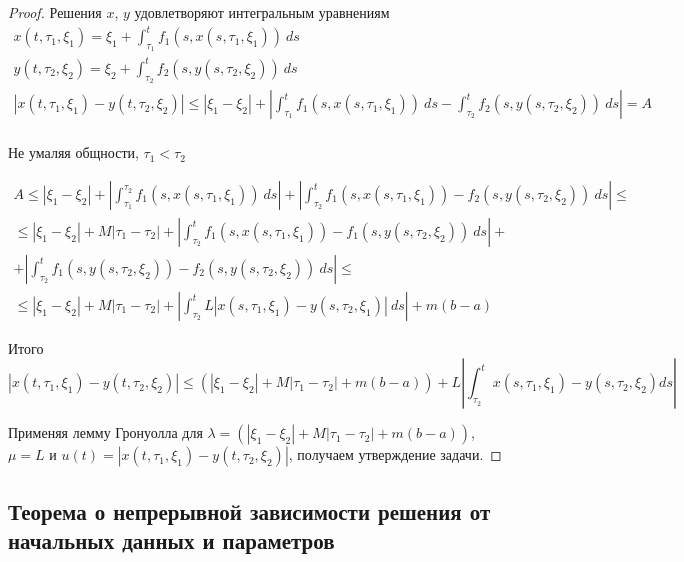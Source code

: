 \begin{proof}

  Решения $x$, $y$ удовлетворяют интегральным уравнениям
  $$
  \begin{gathered}
  x(t, \tau_1, \xi_1) = \xi_1 + \int_{\tau_1}^t f_1(s, x(s, \tau_1, \xi_1))\ ds \\
  y(t, \tau_2, \xi_2) = \xi_2 + \int_{\tau_2}^t f_2(s, y(s, \tau_2, \xi_2))\ ds \\
  \left|x(t, \tau_1, \xi_1) - y(t, \tau_2, \xi_2)\right| \leq |\xi_1 - \xi_2| + \left|\int_{\tau_1}^t f_1(s, x(s, \tau_1, \xi_1))\ ds - \int_{\tau_2}^t f_2(s, y(s, \tau_2, \xi_2))\ ds \right| = A \\
  \end{gathered}
  $$

  Не умаляя общности, $\tau_1 < \tau_2$
  
  $$
  \begin{gathered}
  A \leq |\xi_1 - \xi_2| + \left|\int_{\tau_1}^{\tau_2} f_1(s, x(s, \tau_1, \xi_1))\ ds\right| +  \left|\int_{\tau_2}^t f_1(s, x(s, \tau_1, \xi_1)) - f_2(s, y(s, \tau_2, \xi_2))\ ds \right| \leq \\
  \leq |\xi_1 - \xi_2| + M|\tau_1 - \tau_2| + \left| \int_{\tau_2}^t f_1(s, x(s, \tau_1, \xi_1)) - f_1(s, y(s, \tau_2, \xi_2))\ ds \right| + \\
  + \left| \int_{\tau_2}^t f_1(s, y(s, \tau_2, \xi_2)) - f_2(s, y(s, \tau_2, \xi_2))\ ds \right| \leq \\
  \leq |\xi_1 - \xi_2| + M|\tau_1 - \tau_2| + \left| \int_{\tau_2}^t L|x(s, \tau_1, \xi_1) - y(s, \tau_2, \xi_1)|\ ds\right| + m(b-a)
  \end{gathered}
  $$

  Итого
  $$\left|x(t, \tau_1, \xi_1) - y(t, \tau_2, \xi_2)\right| \leq \left(|\xi_1 - \xi_2| + M|\tau_1 - \tau_2| + m(b-a)\right) + L \left|\int_{\tau_2}^t x(s, \tau_1, \xi_1) - y(s, \tau_2, \xi_2) ds\right|$$

  Применяя лемму Гронуолла для $\lambda = \left(|\xi_1 - \xi_2| + M|\tau_1 - \tau_2| + m(b-a)\right)$, $\mu = L$ и $u(t) = \left|x(t, \tau_1, \xi_1) - y(t, \tau_2, \xi_2)\right|$, получаем утверждение задачи.

\end{proof}



\subsection{Теорема о непрерывной зависимости решения от начальных данных и параметров}

